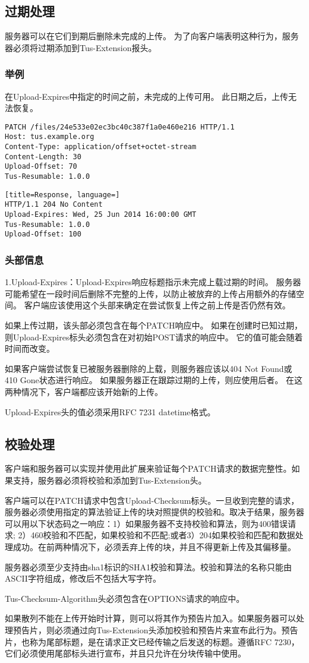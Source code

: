 \documentclass[bachelor]{thesis-uestc}
\begin{document}
\subsection{过期处理}
服务器可以在它们到期后删除未完成的上传。 为了向客户端表明这种行为，服务器必须将过期添加到Tus-Extension报头。
\subsubsection{举例}
在Upload-Expires中指定的时间之前，未完成的上传可用。 此日期之后，上传无法恢复。
\begin{lstlisting}[title=Request]
PATCH /files/24e533e02ec3bc40c387f1a0e460e216 HTTP/1.1
Host: tus.example.org
Content-Type: application/offset+octet-stream
Content-Length: 30
Upload-Offset: 70
Tus-Resumable: 1.0.0
\end{lstlisting}
\begin{lstlisting}[title=Response, language=]
HTTP/1.1 204 No Content
Upload-Expires: Wed, 25 Jun 2014 16:00:00 GMT
Tus-Resumable: 1.0.0
Upload-Offset: 100
\end{lstlisting}
\subsubsection{头部信息}
1.Upload-Expires：Upload-Expires响应标题指示未完成上载过期的时间。 服务器可能希望在一段时间后删除不完整的上传，以防止被放弃的上传占用额外的存储空间。 客户端应该使用这个头部来确定在尝试恢复上传之前上传是否仍然有效。
\par 如果上传过期，该头部必须包含在每个PATCH响应中。 如果在创建时已知过期，则Upload-Expires标头必须包含在对初始POST请求的响应中。 它的值可能会随着时间而改变。
\par 如果客户端尝试恢复已被服务器删除的上载，则服务器应该以404 Not Found或410 Gone状态进行响应。 如果服务器正在跟踪过期的上传，则应使用后者。 在这两种情况下，客户端都应该开始新的上传。
\par Upload-Expires头的值必须采用RFC 7231 datetime格式。

\subsection{校验处理}
客户端和服务器可以实现并使用此扩展来验证每个PATCH请求的数据完整性。如果支持，服务器必须将校验和添加到Tus-Extension头。
\par 客户端可以在PATCH请求中包含Upload-Checksum标头。一旦收到完整的请求，服务器必须使用指定的算法验证上传的块对照提供的校验和。取决于结果，服务器可以用以下状态码之一响应：1）如果服务器不支持校验和算法，则为400错误请求; 2）460校验和不匹配，如果校验和不匹配;或者3）204如果校验和匹配和数据处理成功。在前两种情况下，必须丢弃上传的块，并且不得更新上传及其偏移量。
\par 服务器必须至少支持由sha1标识的SHA1校验和算法。校验和算法的名称只能由ASCII字符组成，修改后不包括大写字符。
\par Tus-Checksum-Algorithm头必须包含在OPTIONS请求的响应中。
\par 如果散列不能在上传开始时计算，则可以将其作为预告片加入。如果服务器可以处理预告片，则必须通过向Tus-Extension头添加校验和预告片来宣布此行为。预告片，也称为尾部标题，是在请求正文已经传输之后发送的标题。遵循RFC 7230，它们必须使用尾部标头进行宣布，并且只允许在分块传输中使用。
\end{document}
